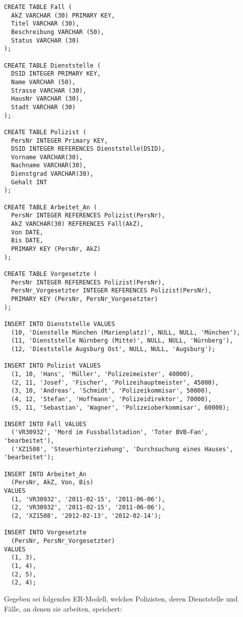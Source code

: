 \documentclass{bschlangaul-aufgabe}
\begin{document}
\begin{bAdditum}[Übungsdatenbank]
\begin{verbatim}
CREATE TABLE Fall (
  AkZ VARCHAR (30) PRIMARY KEY,
  Titel VARCHAR (30),
  Beschreibung VARCHAR (50),
  Status VARCHAR (30)
);

CREATE TABLE Dienststelle (
  DSID INTEGER PRIMARY KEY,
  Name VARCHAR (50),
  Strasse VARCHAR (30),
  HausNr VARCHAR (30),
  Stadt VARCHAR (30)
);

CREATE TABLE Polizist (
  PersNr INTEGER Primary KEY,
  DSID INTEGER REFERENCES Dienststelle(DSID),
  Vorname VARCHAR(30),
  Nachname VARCHAR(30),
  Dienstgrad VARCHAR(30),
  Gehalt INT
);

CREATE TABLE Arbeitet_An (
  PersNr INTEGER REFERENCES Polizist(PersNr),
  AkZ VARCHAR(30) REFERENCES Fall(AkZ),
  Von DATE,
  Bis DATE,
  PRIMARY KEY (PersNr, AkZ)
);

CREATE TABLE Vorgesetzte (
  PersNr INTEGER REFERENCES Polizist(PersNr),
  PersNr_Vorgesetzter INTEGER REFERENCES Polizist(PersNr),
  PRIMARY KEY (PersNr, PersNr_Vorgesetzter)
);

INSERT INTO Dienststelle VALUES
  (10, 'Dienstelle München (Marienplatz)', NULL, NULL, 'München'),
  (11, 'Dienststelle Nürnberg (Mitte)', NULL, NULL, 'Nürnberg'),
  (12, 'Dieststelle Augsburg Ost', NULL, NULL, 'Augsburg');

INSERT INTO Polizist VALUES
  (1, 10, 'Hans', 'Müller', 'Polizeimeister', 40000),
  (2, 11, 'Josef', 'Fischer', 'Polizeihauptmeister', 45000),
  (3, 10, 'Andreas', 'Schmidt', 'Polizeikommisar', 50000),
  (4, 12, 'Stefan', 'Hoffmann', 'Polizeidirektor', 70000),
  (5, 11, 'Sebastian', 'Wagner', 'Polizeioberkommisar', 60000);

INSERT INTO Fall VALUES
  ('VR30932', 'Mord im Fussballstadion', 'Toter BVB-Fan', 'bearbeitet'),
  ('XZ1508', 'Steuerhinterziehung', 'Durchsuchung eines Hauses', 'bearbeitet');

INSERT INTO Arbeitet_An
  (PersNr, AkZ, Von, Bis)
VALUES
  (1, 'VR30932', '2011-02-15', '2011-06-06'),
  (2, 'VR30932', '2011-02-15', '2011-06-06'),
  (2, 'XZ1508', '2012-02-13', '2012-02-14');

INSERT INTO Vorgesetzte
  (PersNr, PersNr_Vorgesetzter)
VALUES
  (1, 3),
  (1, 4),
  (2, 5),
  (2, 4);
\end{verbatim}
\end{bAdditum}

\noindent
Gegeben sei folgendes ER-Modell, welches Polizisten, deren Dienststelle
und Fälle, an denen sie arbeiten, speichert:
\end{document}
